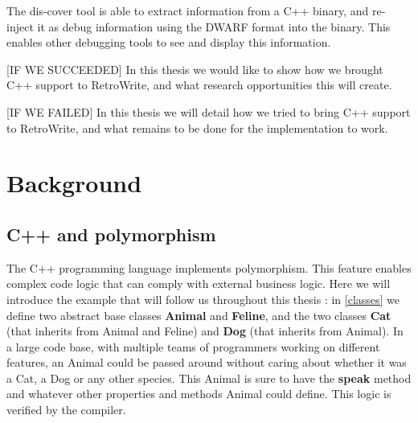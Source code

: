 \documentclass[a4paper,11pt,oneside]{report}
\begin{document}
The dis-cover tool is able to extract information from a C++ binary, and re-inject it as debug information using the DWARF format into the binary.
This enables other debugging tools to see and display this information.







[IF WE SUCCEEDED]
In this thesis we would like to show how we brought C++ support to RetroWrite, and what research opportunities this will create.

[IF WE FAILED]
In this thesis we will detail how we tried to bring C++ support to RetroWrite, and what remains to be done for the implementation to work.


\chapter{Background}



\section{C++ and polymorphism}

The C++ programming language implements polymorphism.
This feature enables complex code logic that can comply with external business logic.
Here we will introduce the example that will follow us throughout this thesis :
in \autoref{classes} we define two abstract base classes \textbf{Animal} and \textbf{Feline},
and the two classes \textbf{Cat} (that inherits from Animal and Feline) and \textbf{Dog} (that inherits from Animal).
In a large code base, with multiple teams of programmers working on different features,
an Animal could be passed around without caring about whether it was a Cat, a Dog or any other species.
This Animal is sure to have the \textbf{speak} method and whatever other properties and methods Animal could define.
This logic is verified by the compiler.
\end{document}
